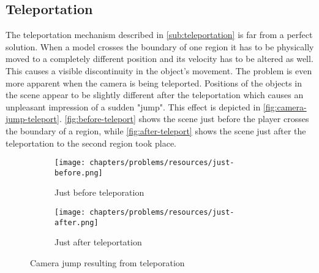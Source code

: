 \subsection{Teleportation}
The teleportation mechanism described in \autoref{sub:teleportation} is far from a perfect solution.
When a model crosses the boundary of one region it has to be physically moved to a completely different position and its velocity has to be altered as well.
This causes a visible discontinuity in the object's movement.
The problem is even more apparent when the camera is being teleported.
Positions of the objects in the scene appear to be slightly different after the teleportation which causes an unpleasant impression of a sudden "jump".
This effect is depicted in \autoref{fig:camera-jump-teleport}.
\autoref{fig:before-teleport} shows the scene just before the player crosses the boundary of a region, while \autoref{fig:after-teleport} shows the scene just after the teleportation to the second region took place.
\begin{figure*}[!htb]
    \centering
    \begin{subfigure}[b]{0.475\textwidth}
        \centering
        \texttt{[image: chapters/problems/resources/just-before.png]}
        \caption[]%
        {{\small Just before teleporation}}
        \label{fig:before-teleport}
    \end{subfigure}
    \hfill
    \begin{subfigure}[b]{0.475\textwidth}
        \centering
        \texttt{[image: chapters/problems/resources/just-after.png]}
        \caption[]%
        {{\small Just after teleportation}}
        \label{fig:after-teleport}
    \end{subfigure}
    \caption[]
    {\small Camera jump resulting from teleporation}
    \label{fig:camera-jump-teleport}
\end{figure*}